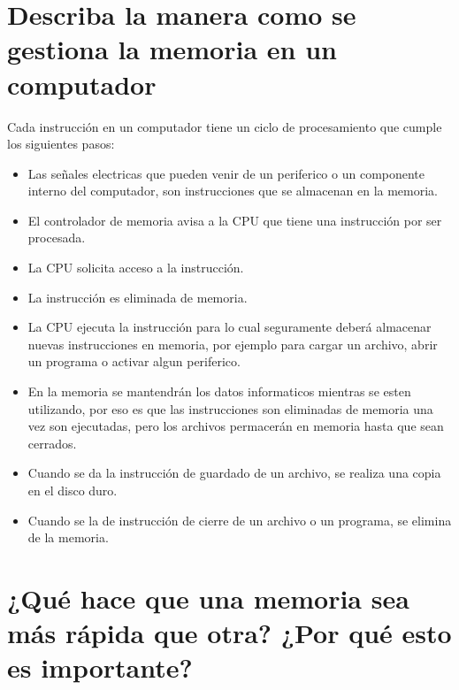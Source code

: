 \documentclass{article}
\begin{document}
\section{Describa la manera como se gestiona la memoria en un computador} 
Cada instrucción en un computador tiene un ciclo de procesamiento que cumple los siguientes pasos:
\begin{itemize}
    \item Las señales electricas que pueden venir de un periferico o un componente interno del computador, son instrucciones que se almacenan en la memoria.
    \item El controlador de memoria avisa a la CPU que tiene una instrucción por ser procesada.
    \item La CPU solicita acceso a la instrucción.
    \item La instrucción es eliminada de memoria.
    \item La CPU ejecuta la instrucción para lo cual seguramente deberá almacenar nuevas instrucciones en memoria, por ejemplo para cargar un archivo, abrir un programa o activar algun periferico.
    \item En la memoria se mantendrán los datos informaticos mientras se esten utilizando, por eso es que las instrucciones son eliminadas de memoria una vez son ejecutadas, pero los archivos permacerán en memoria hasta que sean cerrados.
    \item Cuando se da la instrucción de guardado de un archivo, se realiza una copia en el disco duro.
    \item Cuando se la de instrucción de cierre de un archivo o un programa, se elimina de la memoria.
\end{itemize}

\section{¿Qué hace que una memoria sea más rápida que otra? ¿Por qué esto es importante?} 




\end{document}
